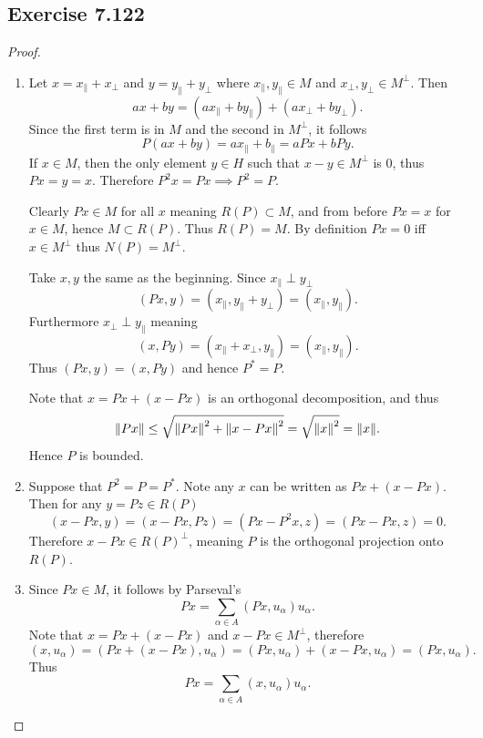 \documentclass[hw_all.tex]{subfiles}
\begin{document}
\subsection{Exercise 7.122}
\begin{proof}
    \begin{enumerate}
        \item 
            Let $x = x_{\parallel} + x_{\perp}$ and $y = y_{\parallel} + y_{\perp}$ where $x_{\parallel}, y_{\parallel} \in M$ and $x_{\perp}, y_{\perp} \in M^\perp$. Then
            \[
                ax + by = (a x_{\parallel} + b y_{\parallel}) + (a x_{\perp} + b y_{\perp})
            .\]
            Since the first term is in $M$ and the second in $M^\perp$, it follows
            \[
                P(ax + by) = a x_{\parallel} + b_{\parallel} = a P x + b P y
            .\]
            If $x \in M$, then the only element $y \in H$ such that $x - y \in M^\perp$ is $0$, thus $Px = y = x$. Therefore $P^2x = Px \implies P^2 = P$.

            Clearly $Px \in M$ for all $x$ meaning $R(P) \subset M$, and from before $Px = x$ for $x \in M$, hence $M \subset R(P)$. Thus $R(P) = M$. By definition $Px = 0$ iff $x \in M^\perp$ thus $N(P) = M^\perp$.

            Take $x,y$ the same as the beginning. Since $x_{\parallel} \perp y_{\perp}$
            \[
                (Px,y) = (x_{\parallel}, y_{\parallel} + y_{\perp}) = (x_{\parallel}, y_{\parallel})
            .\]
            Furthermore $x_{\perp} \perp y_{\parallel}$ meaning
            \[
                (x,Py) = (x_{\parallel} + x_{\perp}, y_{\parallel}) = (x_{\parallel}, y_{\parallel})
            .\]
            Thus $(Px, y) = (x, Py)$ and hence $P^* = P$.

            Note that $x = Px + (x - Px)$ is an orthogonal decomposition, and thus
            \[
                \norm{Px} \leq \sqrt{\norm{Px}^2 + \norm{x - Px}^2} = \sqrt{\norm{x}^2} = \norm{x}
            .\]
            Hence $P$ is bounded.

        \item 
            Suppose that $P^2 = P = P^*$. Note any $x$ can be written as $Px + (x - Px)$. Then for any $y = Pz \in R(P)$
            \[
                (x - Px, y) = (x - Px, Pz) = (Px - P^2x, z) = (Px - Px, z) = 0
            .\]
            Therefore $x - Px \in R(P)^\perp$, meaning $P$ is the orthogonal projection onto $R(P)$.

        \item 
            Since $Px \in M$, it follows by Parseval's
            \[
                Px = \sum_{\alpha \in A} (Px, u_{\alpha}) u_{\alpha}
            .\]
            Note that $x = Px + (x - Px)$ and $x - Px \in M^\perp$, therefore
            \[
                (x, u_{\alpha}) = (Px + (x - Px), u_{\alpha}) = (Px, u_{\alpha}) + (x - Px, u_{\alpha}) = (Px, u_{\alpha})
            .\]
            Thus
            \[
                Px = \sum_{\alpha \in A} (x, u_{\alpha}) u_{\alpha}
            .\]
    \end{enumerate}
\end{proof}
\end{document}

